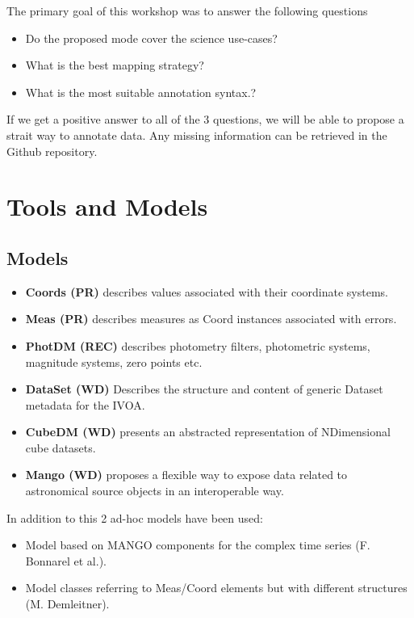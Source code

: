 \documentclass[11pt,a4paper]{ivoa}
\begin{document}
The primary goal of this workshop was to answer the following questions

\begin{itemize}
\item Do the proposed mode cover the science use-cases?
\item What is the best mapping strategy?
\item What is the most suitable annotation syntax.?
\end{itemize}

If we get a positive answer to all of the 3 questions, we will be able to propose a strait way to annotate data.
Any missing information can be retrieved in the Github repository.

\section{Tools and Models}
\subsection{Models}

\begin{itemize}
\item \textbf{Coords (PR)} describes values associated with their coordinate systems.
\item \textbf{Meas (PR)} describes measures as Coord instances associated with errors.
\item \textbf{PhotDM (REC)} describes photometry filters, photometric systems, magnitude systems, zero
points etc.
\item \textbf{DataSet (WD)} Describes the structure and
content of generic Dataset metadata for the IVOA.
\item \textbf{CubeDM  (WD)}  presents an abstracted representation of NDimensional
cube datasets.
\item \textbf{Mango (WD)}  proposes a flexible way to expose data related to astronomical
source objects in an interoperable way.
\end{itemize}

In addition to this 2 ad-hoc models have been used:
\begin{itemize}
\item Model based on MANGO components for the complex time series (F. Bonnarel et al.).
\item Model classes referring to Meas/Coord elements but with different structures (M. Demleitner).
\end{itemize}
\end{document}
